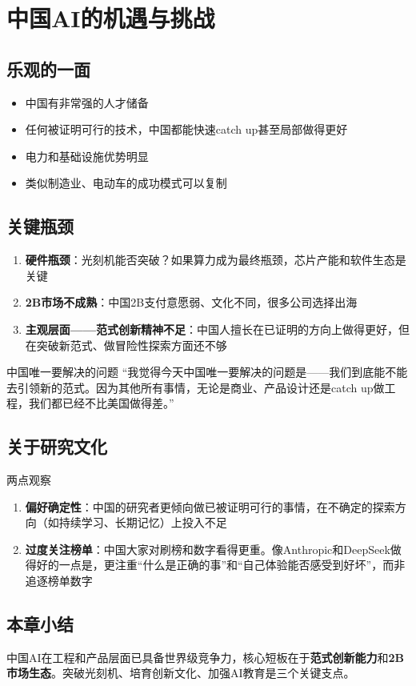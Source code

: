 \section{中国AI的机遇与挑战}

\subsection{乐观的一面}

\begin{itemize}
\item 中国有非常强的人才储备
\item 任何被证明可行的技术，中国都能快速catch up甚至局部做得更好
\item 电力和基础设施优势明显
\item 类似制造业、电动车的成功模式可以复制
\end{itemize}

\subsection{关键瓶颈}

\begin{enumerate}
\item \textbf{硬件瓶颈}：光刻机能否突破？如果算力成为最终瓶颈，芯片产能和软件生态是关键
\item \textbf{2B市场不成熟}：中国2B支付意愿弱、文化不同，很多公司选择出海
\item \textbf{主观层面——范式创新精神不足}：中国人擅长在已证明的方向上做得更好，但在突破新范式、做冒险性探索方面还不够
\end{enumerate}

\begin{warningbox}{中国唯一要解决的问题}
``我觉得今天中国唯一要解决的问题是——我们到底能不能去引领新的范式。因为其他所有事情，无论是商业、产品设计还是catch up做工程，我们都已经不比美国做得差。''
\end{warningbox}

\subsection{关于研究文化}

\begin{knowledgebox}{两点观察}
\begin{enumerate}
\item \textbf{偏好确定性}：中国的研究者更倾向做已被证明可行的事情，在不确定的探索方向（如持续学习、长期记忆）上投入不足
\item \textbf{过度关注榜单}：中国大家对刷榜和数字看得更重。像Anthropic和DeepSeek做得好的一点是，更注重``什么是正确的事''和``自己体验能否感受到好坏''，而非追逐榜单数字
\end{enumerate}
\end{knowledgebox}

\subsection{本章小结}

中国AI在工程和产品层面已具备世界级竞争力，核心短板在于\textbf{范式创新能力}和\textbf{2B市场生态}。突破光刻机、培育创新文化、加强AI教育是三个关键支点。


